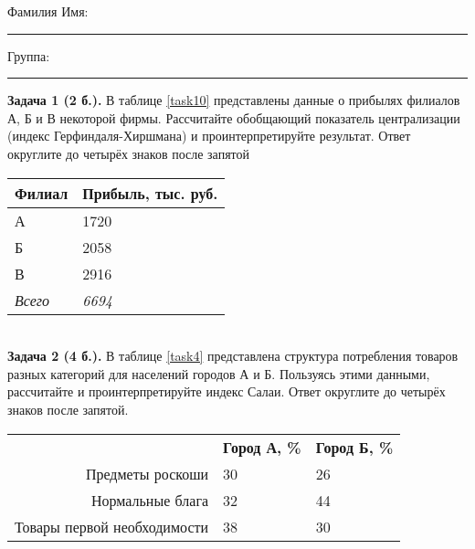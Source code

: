 \documentclass{article}
\begin{document}
\mbox{}

\vspace{-36pt}

\begin{center}
	\begin{tcolorbox}[colback=white, boxrule=0.20ex, sharp corners = all, height=25pt, colframe=black, valign=top]
		\begin{center}
			Фамилия Имя:\hspace{1.5pt}\rule{190pt}{0pt}\hspace{50pt}Группа:\hspace{1.5pt}\rule{60pt}{0pt}
		\end{center}
	\end{tcolorbox}
\end{center}
\vspace{3pt}

\textbf{Задача 1 (2 б.).} В таблице \ref{task10} представлены данные о прибылях филиалов А, Б и В некоторой фирмы. Рассчитайте обобщающий показатель централизации (индекс Герфиндаля-Хиршмана) и проинтерпретируйте результат. Ответ округлите до четырёх знаков после запятой\\

\begin{minipage}{\textwidth}
\centering
\begin{tabularx}{0.4\textwidth}{YY}
\toprule
\textbf{Филиал} & \textbf{Прибыль, тыс. руб.} \\
\midrule
А & 1720 \\

Б & 2058 \\

В & 2916 \\
\addlinespace
\textit{Всего} & \textit{6694} \\
\bottomrule
\end{tabularx}
\label{task10}
\end{minipage} \\[35pt]

\textbf{Задача 2 (4 б.).} В таблице \ref{task4} представлена структура потребления товаров разных категорий для населений городов А и Б. Пользуясь этими данными, рассчитайте и проинтерпретируйте индекс Салаи. Ответ округлите до четырёх знаков после запятой.\\

\begin{minipage}{\textwidth}
\centering
\begin{tabularx}{0.7\textwidth}{rYY}
\toprule
 & \textbf{Город А, \%} & \textbf{Город Б, \%} \\
\cmidrule(lr){2-2}\cmidrule(lr){3-3}
Предметы роскоши & 30 & 26 \\

Нормальные блага & 32 & 44 \\

Товары первой необходимости & 38 & 30 \\
\bottomrule
\end{tabularx}
\label{task4}
\end{minipage} \\[35pt]
\end{document}
